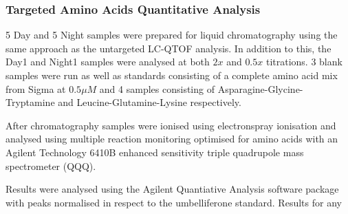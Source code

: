 %
%
%
%
%
%
%

%

\subsubsection{Targeted Amino Acids Quantitative Analysis}

5 Day and 5 Night samples were prepared for liquid chromatography
using the same approach as the untargeted LC-QTOF analysis.
In addition to this, the Day1 and Night1 samples were analysed at both
\(2x\) and \(0.5x\) titrations.  3 blank samples were run 
as well as standards consisting of a complete amino acid
mix from Sigma at \(0.5\mu M\) and 4 samples consisting of Asparagine-Glycine-Tryptamine
and Leucine-Glutamine-Lysine respectively.

After chromatography samples were ionised using electronspray ionisation
and analysed using multiple reaction monitoring optimised
for amino acids with an Agilent Technology
6410B enhanced sensitivity triple quadrupole mass spectrometer (QQQ).

Results were analysed using the Agilent Quantiative Analysis software package
with peaks normalised in respect to the umbelliferone standard.  Results for any 

















